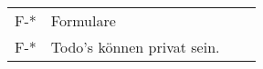 \begin{tabularx}{\textwidth}{|l|X|l|l|}
    F-* & Formulare & &\\

    F-* & Todo's können privat sein. & & \\

    




    \bottomrule
\end{tabularx}




%
%
%
%
%
%
%
%
